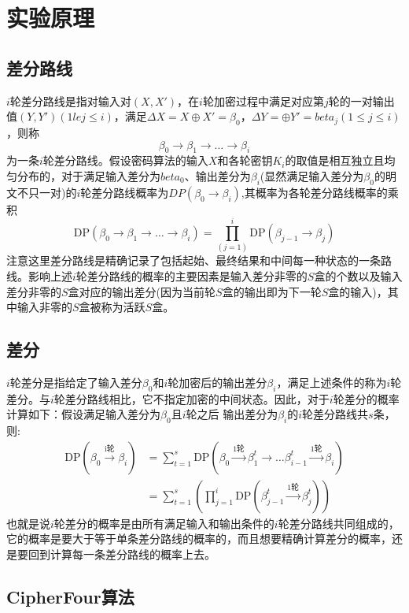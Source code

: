 \section{实验原理}

\subsection{差分路线}
$i$轮差分路线是指对输入对$(X,X')$，在$i$轮加密过程中满足对应第$j$轮的一对输出值$(Y,Y')(1
le j \le i)$，满足$\Delta X = X \oplus X' = \beta_0$，$\Delta Y =  \oplus Y' = beta_j(1 \le j \le i)$，则称
$$
 \beta_0  \to \beta_1 \to \dots \to \beta_i 
$$
为一条$i$轮差分路线。假设密码算法的输入$X$和各轮密钥$K_i$的取值是相互独立且均匀分布的，对于满足输入差分为$beta_0$、输出差分为$\beta_i$(显然满足输入差分为$\beta_0$的明文不只一对)的$i$轮差分路线概率为$DP(\beta_0 \to \beta_i)$,其概率为各轮差分路线概率的乘积
$$
\text{DP}(\beta_0 \to \beta_1 \to \dots \to \beta_i)  = \prod_{(j=1)}^{i}\text{DP}(\beta_{j-1} \to \beta_j)
$$
注意这里差分路线是精确记录了包括起始、最终结果和中间每一种状态的一条路线。影响上述$i$轮差分路线的概率的主要因素是输入差分非零的$S$盒的个数以及输入差分非零的$S$盒对应的输出差分(因为当前轮$S$盒的输出即为下一轮$S$盒的输入)，其中输入非零的$S$盒被称为活跃$S$盒。

\subsection{差分}
$i$轮差分是指给定了输入差分$\beta_0$和$i$轮加密后的输出差分$\beta_i$，满足上述条件的称为$i$轮差分。与$i$轮差分路线相比，它不指定加密的中间状态。因此，对于$i$轮差分的概率计算如下：假设满足输入差分为$\beta_0$且$i$轮之后
输出差分为$\beta_i$的$i$轮差分路线共$s$条，则:
$$
\begin{aligned}
    \text{DP}(\beta_0 \xrightarrow{\text{i轮}} \beta_i) &= \sum_{t=1}^s \text{DP}( \beta_0 \xrightarrow{\text{1轮}} \beta_1^t \to \dots \beta_{i-1}^t \xrightarrow{\text{1轮}} \beta_i)\\
                                                        &= \sum_{t=1}^s (\prod_{j=1}^i \text{DP} (\beta_{j-1}^t \xrightarrow{\text{1轮}} \beta_j^t))
\end{aligned}
$$
也就是说$i$轮差分的概率是由所有满足输入和输出条件的$i$轮差分路线共同组成的，它的概率是要大于等于单条差分路线的概率的，而且想要精确计算差分的概率，还是要回到计算每一条差分路线的概率上去。

\subsection{CipherFour算法}

